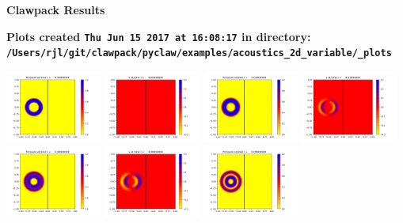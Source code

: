 \documentclass[11pt]{article}
\begin{document}
        \begin{center}{\Large\bf Clawpack Results}\vskip 5pt
        
        \bf Plots created {\tt Thu Jun 15 2017 at 16:08:17} in directory: \vskip 5pt
        \verb+/Users/rjl/git/clawpack/pyclaw/examples/acoustics_2d_variable/_plots+
        \end{center}
        \vskip 5pt
        \includegraphics[width=0.2375\textwidth]{frame0000fig0.png}
\includegraphics[width=0.2375\textwidth]{frame0000fig1.png}
\includegraphics[width=0.2375\textwidth]{frame0001fig0.png}
\includegraphics[width=0.2375\textwidth]{frame0001fig1.png}
\vskip 10pt 
\includegraphics[width=0.2375\textwidth]{frame0002fig0.png}
\includegraphics[width=0.2375\textwidth]{frame0002fig1.png}
\includegraphics[width=0.2375\textwidth]{frame0003fig0.png}
\end{document}
